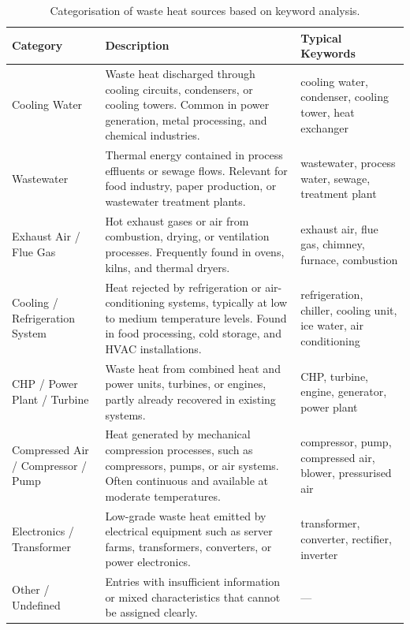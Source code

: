 \documentclass[letterpaper,11pt]{article}
\begin{document}
\begin{table}[H]
	\centering
	\caption{Categorisation of waste heat sources based on keyword analysis.}
	\begin{tabular}{p{3.3cm} p{8cm} p{5cm}}
		\hline
		\textbf{Category} & \textbf{Description} & \textbf{Typical Keywords} \\
		\hline
		Cooling Water & Waste heat discharged through cooling circuits, condensers, or cooling towers. Common in power generation, metal processing, and chemical industries. & cooling water, condenser, cooling tower, heat exchanger \\
		\hline
		Wastewater & Thermal energy contained in process effluents or sewage flows. Relevant for food industry, paper production, or wastewater treatment plants. & wastewater, process water, sewage, treatment plant \\
		\hline
		Exhaust Air / Flue Gas & Hot exhaust gases or air from combustion, drying, or ventilation processes. Frequently found in ovens, kilns, and thermal dryers. & exhaust air, flue gas, chimney, furnace, combustion \\
		\hline
		Cooling / Refrigeration System & Heat rejected by refrigeration or air-conditioning systems, typically at low to medium temperature levels. Found in food processing, cold storage, and HVAC installations. & refrigeration, chiller, cooling unit, ice water, air conditioning \\
		\hline
		CHP / Power Plant / Turbine & Waste heat from combined heat and power units, turbines, or engines, partly already recovered in existing systems. & CHP, turbine, engine, generator, power plant \\
		\hline
		Compressed Air / Compressor / Pump & Heat generated by mechanical compression processes, such as compressors, pumps, or air systems. Often continuous and available at moderate temperatures. & compressor, pump, compressed air, blower, pressurised air \\
		\hline
		Electronics / Transformer & Low-grade waste heat emitted by electrical equipment such as server farms, transformers, converters, or power electronics. & transformer, converter, rectifier, inverter \\
		\hline Other / Undefined & Entries with insufficient information or mixed characteristics that cannot be assigned clearly. & --- \\ \hline
	\end{tabular}
	\label{tab:whs_categories}
\end{table}
\end{document}
